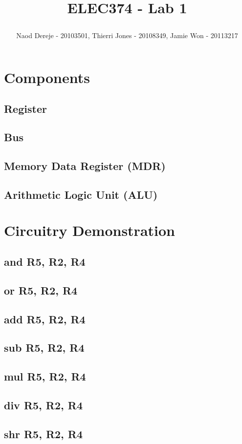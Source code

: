 \documentclass{article}
\title{
    \begin{large}
        ELEC374 - Lab 1
    \end{large}
}
\author{Naod Dereje - 20103501, Thierri Jones - 20108349, Jamie Won - 20113217}
\begin{document}
\maketitle
\cleardoublepage
\tableofcontents
\cleardoublepage

\section{Components}
    \subsection{Register}
    \subsection{Bus}
    \subsection{Memory Data Register (MDR)}
    \subsection{Arithmetic Logic Unit (ALU)}
\section{Circuitry Demonstration}
    \subsection{and R5, R2, R4}
    \subsection{or R5, R2, R4}
    \subsection{add R5, R2, R4}
    \subsection{sub R5, R2, R4}
    \subsection{mul R5, R2, R4}
    \subsection{div R5, R2, R4}
    \subsection{shr R5, R2, R4}
\end{document}

